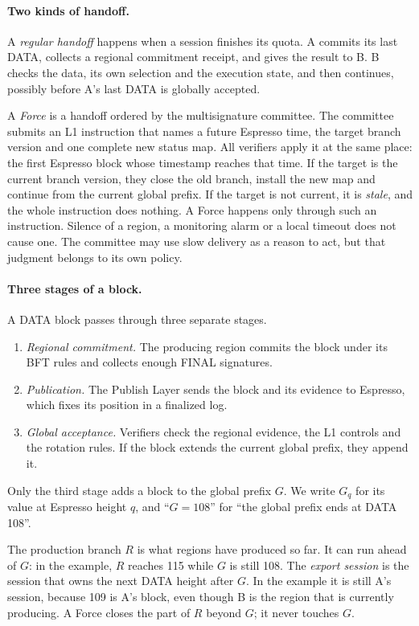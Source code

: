 \documentclass[11pt,a4paper]{article}
\newcommand{\defterm}[1]{\textcolor{rrBlue}{\textit{#1}}}
\begin{document}
\paragraph{Two kinds of handoff.}
A \defterm{regular handoff} happens when a session finishes its quota.
A commits its last DATA, collects a regional commitment receipt, and
gives the result to B. B checks the data, its own selection and the
execution state, and then continues, possibly before A's last
DATA is globally accepted.

A \defterm{Force} is a handoff ordered by the multisignature committee.
The committee submits an L1 instruction that names a future Espresso
time, the target branch version and one complete new status map. All
verifiers apply it at the same place: the first Espresso block whose
timestamp reaches that time. If the target is the current branch
version, they close the old branch, install the new map and continue
from the current global prefix. If the target is not current, it is
\emph{stale}, and the whole instruction does nothing. A Force happens
only through such an instruction. Silence of a region, a monitoring
alarm or a local timeout does not cause one. The committee may use slow
delivery as a reason to act, but that judgment belongs to its own
policy.

\paragraph{Three stages of a block.}
A DATA block passes through three separate stages.
\begin{enumerate}
\item \emph{Regional commitment.} The producing region commits the block
under its BFT rules and collects enough FINAL signatures.
\item \emph{Publication.} The Publish Layer sends the block and its
evidence to Espresso, which fixes its position in a finalized log.
\item \emph{Global acceptance.} Verifiers check the regional evidence,
the L1 controls and the rotation rules. If the block extends the
current global prefix, they append it.
\end{enumerate}
Only the third stage adds a block to the global prefix $G$.
We write $G_q$ for its value at Espresso height $q$, and ``$G=108$'' for
``the global prefix ends at DATA 108''.

The production branch $R$ is what regions have produced so
far. It can run ahead of $G$: in the example, $R$ reaches 115 while
$G$ is still 108. The \defterm{export session} is the session that owns
the next DATA height after $G$. In the example it is still A's
session, because 109 is A's block, even though B is the region that is
currently producing. A Force closes the part of $R$ beyond $G$; it
never touches $G$.
\end{document}
